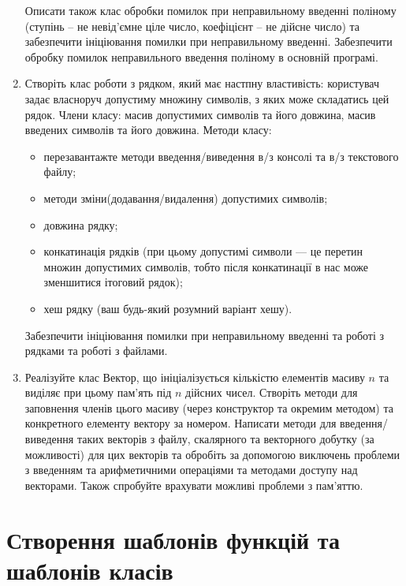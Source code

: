 \documentclass[a5paper,titlepage,openany,twoside,draft]{book_unv}%
\begin{document}
\begin{enumerate}
Описати також клас обробки помилок при неправильному введенні поліному
(ступінь -- не невід'ємне ціле число, коефіцієнт -- не дійсне число) та
забезпечити ініціювання помилки при неправильному введенні.
Забезпечити обробку помилок неправильного введення поліному в основній програмі.

\item
Створіть клас роботи з рядком, який має настпну властивість: 
користувач задає власноруч допустиму множину символів, з яких може складатись цей рядок.
Члени класу: масив допустимих символів та його довжина,
масив введених символів та його довжина.
Методи класу:
\begin{itemize}
\item
перезавантажте методи введення/виведення в/з консолі та в/з текстового файлу;
\item
методи зміни(додавання/видалення) допустимих символів;
\item
довжина рядку;
\item
конкатинація рядків (при цьому допустимі символи --- це перетин 
множин допустимих символів, 
тобто після конкатинації в нас може зменшитися ітоговий рядок);
\item
хеш рядку (ваш будь-який розумний варіант хешу).
\end{itemize}
Забезпечити ініціювання помилки при неправильному введенні та роботі з рядками 
та роботі з файлами.

\item

Реалізуйте клас Вектор, що ініціалізується кількістю елементів масиву $n$
  та виділяє при цьому пам'ять під $n$ дійсних чисел. Створіть методи для
  заповнення членів цього масиву (через конструктор та окремим методом)
  та конкретного елементу вектору за номером. 
  Написати методи для введення/виведення таких векторів з файлу,
  скалярного та векторного добутку (за можливості) для цих векторів та обробіть
  за допомогою виключень проблеми з введенням та арифметичними операціями та методами 
 доступу над векторами. Також спробуйте врахувати можливі проблеми з пам'яттю.
 
\end{enumerate}


\chapter{Створення шаблонів функцій та шаблонів класів}
%
\end{document}
